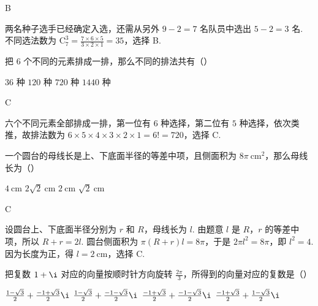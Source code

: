 \documentclass[UTF8,a4paper,oneside,11pt]{ctexbook}
\begin{document}
\begin{answer}
B
\end{answer}

\begin{solution}
两名种子选手已经确定入选，还需从另外 \(9-2=7\) 名队员中选出 \(5-2=3\) 名. 不同选法数为 \(\mathrm C_7^3=\frac{7\times6\times5}{3\times2\times1}=35\)，选择 B.
\end{solution}

\begin{problem}
把 \(6\) 个不同的元素排成一排，那么不同的排法共有（\quad）

\choices
    {\(36\) 种}
    {\(120\) 种}
    {\(720\) 种}
    {\(1440\) 种}
\end{problem}

\begin{answer}
C
\end{answer}

\begin{solution}
六个不同元素全部排成一排，第一位有 \(6\) 种选择，第二位有 \(5\) 种选择，依次类推，故排法数为 \(6\times5\times4\times3\times2\times1=6!=720\)，选择 C.
\end{solution}

\begin{problem}
一个圆台的母线长是上、下底面半径的等差中项，且侧面积为 \(8\pi \mathrm{~cm}^2\)，那么母线长为（\quad）

\choices
    {\(4\mathrm{~cm}\)}
    {\(2\sqrt{2}\mathrm{~cm}\)}
    {\(2\mathrm{~cm}\)}
    {\(\sqrt{2}\mathrm{~cm}\)}
\end{problem}

\begin{answer}
C
\end{answer}

\begin{solution}
设圆台上、下底面半径分别为 \(r\) 和 \(R\)，母线长为 \(l\). 由题意 \(l\) 是 \(R\)，\(r\) 的等差中项，所以 \(R+r=2l\). 圆台侧面积为 \(\pi(R+r)l=8\pi\)，于是 \(2\pi l^2=8\pi\)，即 \(l^2=4\). 因为长度为正，得 \(l=2\mathrm{~cm}\)，选择 C.
\end{solution}

\begin{problem}
把复数 \(1+\i\) 对应的向量按顺时针方向旋转 \(\frac{2\pi}{3}\)，所得到的向量对应的复数是（\quad）

\choices
    {\(\frac{1-\sqrt{3}}{2}+\frac{-1+\sqrt{3}}{2}\i\)}
    {\(\frac{1-\sqrt{3}}{2}+\frac{-1-\sqrt{3}}{2}\i\)}
    {\(\frac{-1+\sqrt{3}}{2}+\frac{-1-\sqrt{3}}{2}\i\)}
    {\(\frac{-1+\sqrt{3}}{2}+\frac{1-\sqrt{3}}{2}\i\)}
\end{problem}
\end{document}
